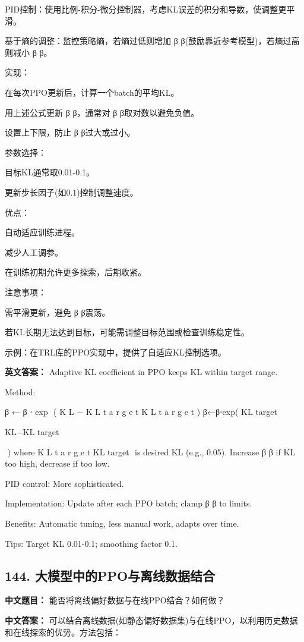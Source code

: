 \documentclass[10pt,a4paper]{ctexart}
\begin{document}
PID控制：使用比例-积分-微分控制器，考虑KL误差的积分和导数，使调整更平滑。

基于熵的调整：监控策略熵，若熵过低则增加
β
β(鼓励靠近参考模型)，若熵过高则减小
β
β。

实现：

在每次PPO更新后，计算一个batch的平均KL。

用上述公式更新
β
β，通常对
β
β取对数以避免负值。

设置上下限，防止
β
β过大或过小。

参数选择：

目标KL通常取0.01-0.1。

更新步长因子(如0.1)控制调整速度。

优点：

自动适应训练进程。

减少人工调参。

在训练初期允许更多探索，后期收紧。

注意事项：

需平滑更新，避免
β
β震荡。

若KL长期无法达到目标，可能需调整目标范围或检查训练稳定性。

示例：在TRL库的PPO实现中，提供了自适应KL控制选项。

\textbf{英文答案：}
Adaptive KL coefficient in PPO keeps KL within target range.

Method:

β
←
β
⋅
exp
⁡
(
K
L
−
K
L
t
a
r
g
e
t
K
L
t
a
r
g
e
t
)
β←β⋅exp( 
KL 
target
​
 
KL−KL 
target
​
 
​
 )
where 
K
L
t
a
r
g
e
t
KL 
target
​
  is desired KL (e.g., 0.05). Increase 
β
β if KL too high, decrease if too low.

PID control: More sophisticated.

Implementation: Update after each PPO batch; clamp 
β
β to limits.

Benefits: Automatic tuning, less manual work, adapts over time.

Tips: Target KL 0.01-0.1; smoothing factor 0.1.

\subsection*{144. 大模型中的PPO与离线数据结合}
\textbf{中文题目：} 能否将离线偏好数据与在线PPO结合？如何做？

\textbf{中文答案：}
可以结合离线数据(如静态偏好数据集)与在线PPO，以利用历史数据和在线探索的优势。方法包括：
\end{document}

